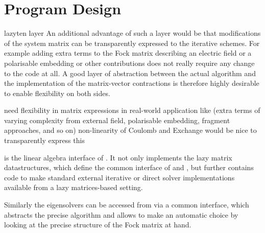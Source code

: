  \section{Program Design}
\label{sec:design}

lazyten layer
An additional advantage of such a layer would be that
modifications of the system matrix can be transparently expressed
to the iterative schemes.
For example adding extra terms to the Fock matrix
describing an electric field or a polarisable embedding
or other contributions does not really require
any change to the \SCF code at all.
A good layer of abstraction between the actual \SCF algorithm
and the implementation of the matrix-vector contractions
is therefore highly desirable to enable flexibility on both sides.

need flexibility in matrix expressions in real-world application
like \SCF (extra terms of varying complexity from external field,
polarisable embedding, fragment approaches, and so on)
non-linearity of Coulomb and Exchange
would be nice to transparently express this


\lazyten is the linear algebra interface of \molsturm.
It not only implements the lazy matrix datastructures,
which define the common interface of \gint and \gscf,
but further contains code to make standard external
iterative or direct solver implementations available
from a lazy matrices-based setting.

Similarly the eigensolvers can be accessed from \gscf via a common interface,
which abstracts the precise algorithm and allows \lazyten to make an automatic
choice by looking at the precise structure of the Fock matrix at hand.





